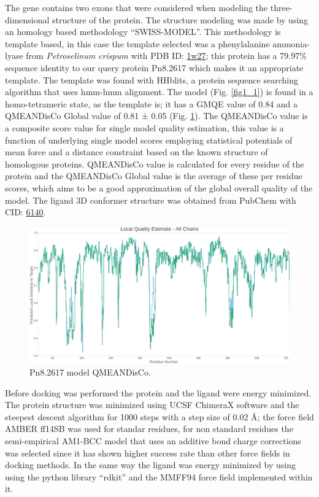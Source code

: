 \documentclass[12pt]{article}
\begin{document}
	The gene contains two exons that were considered when modeling the three-dimensional structure of the protein. The structure modeling was made by using an homology based methodology ``SWISS-MODEL''. \cite{swiss,quaternary_swiss} This methodology is template based, in this case the template selected was a phenylalanine ammonia-lyase from \textit{Petroselinum crispum} with PDB ID: \href{https://www.rcsb.org/structure/1w27}{1w27}; this protein has a 79.97\% sequence identity to our query protein Pn8.2617 which makes it an appropriate template. The template was found with HHblits, a protein sequence searching algorithm that uses hmm-hmm alignment. \cite{hhblits} The model (Fig. \ref{fig1_1}) is found in a homo-tetrameric state, as the template is; it has a GMQE value of 0.84 and a QMEANDisCo Global value of 0.81 ± 0.05 (Fig. \ref{fig1_2}). The QMEANDisCo value is a composite score value for single model quality estimation, this value is a function of underlying single model scores employing statistical potentials of mean force and a distance constraint based on the known structure of homologous proteins. QMEANDisCo value is calculated for every residue of the protein and the QMEANDisCo Global value is the average of these per residue scores, which aims to be a good approximation of the global overall quality of the model. \cite{qmeandisco_swiss} The ligand 3D conformer structure was obtained from PubChem with CID: \href{https://pubchem.ncbi.nlm.nih.gov/compound/6140}{6140}.

	
	\FloatBarrier
	\begin{figure}[h!]
		\centering
		\includegraphics[width=\textwidth-50pt]{../1/Swiss/Local_quality_estimate.png}
		\caption{\centering Pn8.2617 model QMEANDisCo.}
		\label{fig1_2}
	\end{figure}
	\FloatBarrier
	
	Before docking was performed the protein and the ligand were energy minimized. The protein structure was minimized using UCSF ChimeraX software \cite{chimera,chimera_2} and the steepest descent algorithm for 1000 steps with a step size of 0.02 \r{A}; the force field AMBER ff14SB was used for standar residues, for non standard residues the semi-empirical AM1-BCC model that uses an additive bond charge corrections was selected since it has shown higher success rate than other force fields in docking methods. \cite{am1_bcc,am1_bcc_2,am1_bcc_3} In the same way the ligand was energy minimized by using using the python library ``rdkit'' and the MMFF94 force field implemented within it. \cite{rdkit,rdkit_mmff}
	
\end{document}

